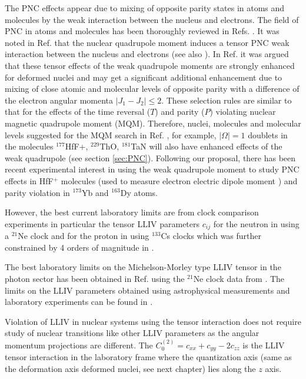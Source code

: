 \documentclass[10pt,a4paper, twoside, openright]{report}
\begin{document}
 
 The PNC effects appear due to mixing of opposite parity states in atoms and molecules by the weak interaction between the nucleus and electrons. The field  of PNC in atoms and molecules has been thoroughly reviewed in Refs.  \cite{KhriplovichPNC,GingesReview,RobertsReview}. It was noted in Ref.  \cite{FS78} that the nuclear quadrupole moment induces a tensor PNC weak interaction between the nucleus and electrons (see also  \cite{KhriplovichPNC,KP91}). In Ref. \cite{Flambaum2016} it was argued that these tensor  effects of the weak quadrupole moments are strongly enhanced for deformed nuclei and may get a significant additional enhancement due to mixing of  close atomic and molecular levels of opposite parity with a  difference of the electron angular momenta $|J_1-J_2| \le 2$. These selection rules are similar to that for the effects of the time reversal ($T$) and parity ($P$) violating nuclear magnetic quadrupole moment (MQM). Therefore, nuclei, molecules and molecular levels  suggested for the MQM search in Ref. \cite{Flambaum2014},  for example,  $|\Omega |=1$ doublets in the molecules $^{177}$HfF+, $^{229}$ThO, $^{181}$TaN will also have enhanced effects of the weak quadrupole (see section \ref{sec:PNC}). Following our proposal, there has been recent experimental interest in using the weak quadrupole moment to study PNC effects in HfF$^{+}$ molecules (used to measure electron electric dipole moment \cite{Cairncross2017}) and parity violation in $^{173}$Yb \cite{Antypas2017} and $^{163}$Dy \cite{Leefer2017} atoms. 
 
  However, the best current laboratory limits are from clock comparison experiments \cite{Prestage1985, Chupp1989, Hohensee2013, Dzuba2016} in particular the tensor LLIV parameters $c_{ij}$ for the neutron in \cite{Smiciklas2011} using a $^{21}$Ne clock and for the proton in \cite{Wolf2006} using $^{133}$Cs clocks which was further constrained by 4 orders of magnitude in \cite{Flambaum2016}.
  
  The best laboratory limits on the Michelson-Morley type LLIV tensor in the photon sector has been obtained in Ref. \cite{FlambaumRomalis2017}  using the $^{21}$Ne clock data from  \cite{Smiciklas2011}.  
The limits on the LLIV parameters  obtained using astrophysical measurements and laboratory experiments can be found in \cite{Kostelecky1999, LorentzDataTables2017}.
 
Violation of LLIV in nuclear systems using the tensor interaction does not require study of nuclear transitions like other LLIV parameters as the angular momentum projections are different. The $C_0^{(2)} = c_{xx} + c_{yy} - 2c_{zz}$ is the LLIV tensor interaction in the laboratory frame where the quantization axis (same as the deformation axis deformed nuclei, see next chapter) lies along the $z$ axis.

\end{document}
